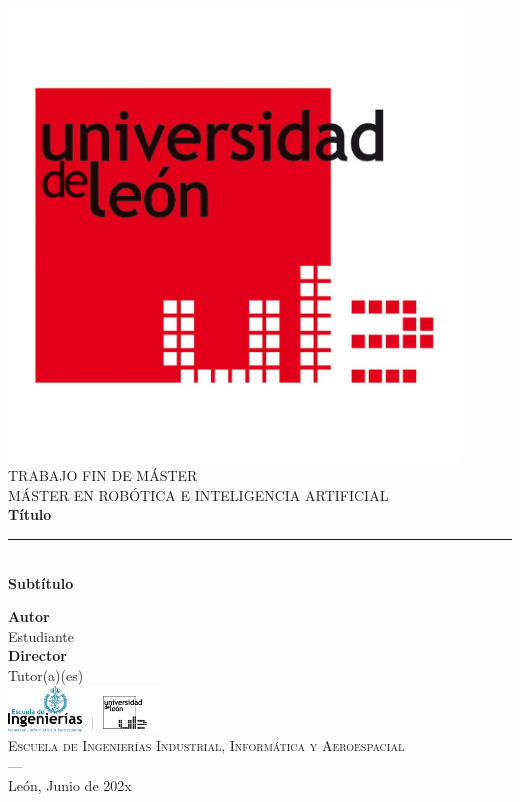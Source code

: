 \begin{titlepage}
\newlength{\centeroffset}
\setlength{\centeroffset}{-0.5\oddsidemargin}
\addtolength{\centeroffset}{0.5\evensidemargin}
\thispagestyle{empty}

\noindent\hspace*{\centeroffset}\begin{minipage}{\textwidth}

\centering
\includegraphics[width=0.9\textwidth]{logos/logo_ule.jpg}\\[1.4cm]

\textsc{ \Large TRABAJO FIN DE MÁSTER\\[0.2cm]}
\textsc{ MÁSTER EN ROBÓTICA E INTELIGENCIA ARTIFICIAL}\\[1cm]

{\Huge\bfseries Título \\}
\noindent\rule[-1ex]{\textwidth}{3pt}\\[3.5ex]
{\large\bfseries Subtítulo }
\end{minipage}

\vspace{2.5cm}
\noindent\hspace*{\centeroffset}
\begin{minipage}{\textwidth}
\centering

\textbf{Autor}\\ {Estudiante}\\[2.5ex]
\textbf{Director}\\ {Tutor(a)(es)}\\[2cm]
\includegraphics[width=0.3\textwidth]{logos/eiiia_logo.webp}\\[0.1cm]
\textsc{Escuela de Ingenierías Industrial, Informática y Aeroespacial}\\
\textsc{---}\\
León, Junio de 202x
\end{minipage}
\end{titlepage}
